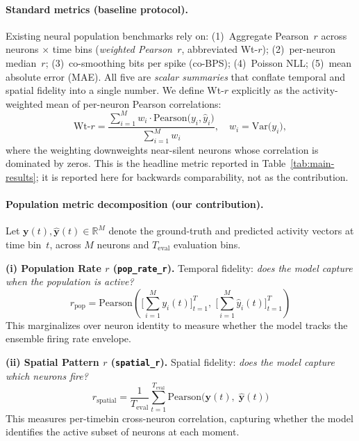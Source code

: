 \documentclass{article}
\begin{document}
\paragraph{Standard metrics (baseline protocol).}
Existing neural population benchmarks rely on:
(1)~Aggregate Pearson~$r$ across neurons $\times$ time bins
(\emph{weighted Pearson~$r$}, abbreviated Wt-$r$);
(2)~per-neuron median~$r$;
(3)~co-smoothing bits per spike (co-BPS);
(4)~Poisson NLL;
(5)~mean absolute error (MAE).
All five are \emph{scalar summaries} that conflate temporal and spatial
fidelity into a single number.  We define Wt-$r$ explicitly as the
activity-weighted mean of per-neuron Pearson correlations:
\begin{equation}
  \mathrm{Wt}\text{-}r = \frac{\sum_{i=1}^{M} w_i \cdot
      \mathrm{Pearson}\bigl(y_i,\hat y_i\bigr)}
      {\sum_{i=1}^{M} w_i},
  \quad w_i = \mathrm{Var}\bigl(y_i\bigr),
  \label{eq:wt-r}
\end{equation}
where the weighting downweights near-silent neurons whose
correlation is dominated by zeros.  This is the headline metric
reported in Table~\ref{tab:main-results}; it is reported here for
backwards comparability, not as the contribution.

\paragraph{Population metric decomposition (our contribution).}
Let $\mathbf{y}(t), \hat{\mathbf{y}}(t) \in \mathbb{R}^M$ denote the
ground-truth and predicted activity vectors at time bin~$t$, across
$M$ neurons and $T_\mathrm{eval}$ evaluation bins.

\textbf{(i) Population Rate $r$ (\texttt{pop\_rate\_r}).}
Temporal fidelity: \emph{does the model capture when the population
is active?}
\begin{equation}
  r_\mathrm{pop} = \mathrm{Pearson}\!\left(
    \Big[{\textstyle\sum_{i=1}^{M} y_i(t)}\Big]_{t=1}^{T},\;
    \Big[{\textstyle\sum_{i=1}^{M} \hat{y}_i(t)}\Big]_{t=1}^{T}
  \right)
  \label{eq:pop-rate}
\end{equation}
This marginalizes over neuron identity to measure whether the model
tracks the ensemble firing rate envelope.

\textbf{(ii) Spatial Pattern $r$ (\texttt{spatial\_r}).}
Spatial fidelity: \emph{does the model capture which neurons fire?}
\begin{equation}
  r_\mathrm{spatial} = \frac{1}{T_\mathrm{eval}}
  \sum_{t=1}^{T_\mathrm{eval}}
  \mathrm{Pearson}\!\big(\mathbf{y}(t),\;\hat{\mathbf{y}}(t)\big)
  \label{eq:spatial}
\end{equation}
This measures per-timebin cross-neuron correlation, capturing whether
the model identifies the active subset of neurons at each moment.
\end{document}
